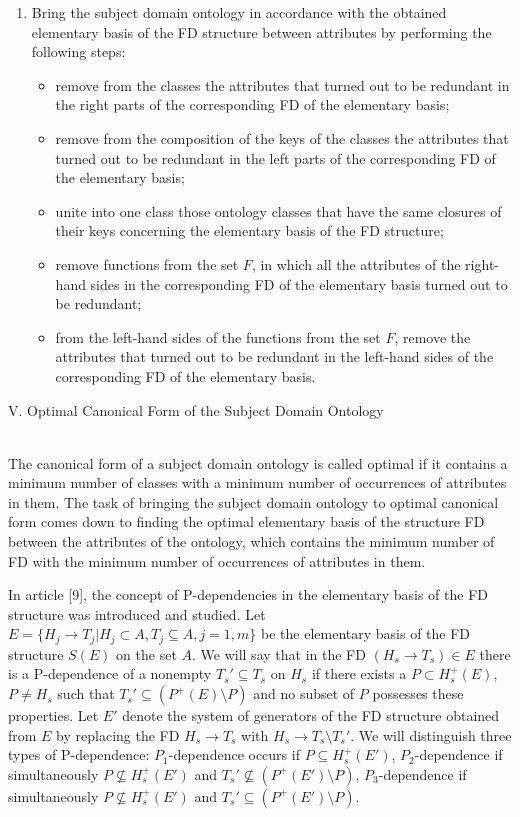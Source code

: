 \documentclass{scndocument}
\begin{document}
\begin{enumerate}[noitemsep]
    \item Bring the subject domain ontology in accordance with the obtained elementary basis of the FD structure between attributes by performing the following steps:
    \begin{itemize}[noitemsep]
        \item remove from the classes the attributes that turned out to be redundant in the right parts of the corresponding FD of the elementary basis;
        \item remove from the composition of the keys of the classes the attributes that turned out to be redundant in the left parts of the corresponding FD of the elementary basis;
        \item unite into one class those ontology classes that have the same closures of their keys concerning the elementary basis of the FD structure;
        \item remove functions from the set $F$, in which all the attributes of the right-hand sides in the corresponding FD of the elementary basis turned out to be redundant;
        \item from the left-hand sides of the functions from the set $F$, remove the attributes that turned out to be redundant in the left-hand sides of the corresponding FD of the elementary basis.
    \end{itemize}
\end{enumerate}

\begin{center}
{V. Optimal Canonical Form of the Subject Domain Ontology}
\end{center}
\\

{The canonical form of a subject domain ontology is called optimal if it contains a minimum number of classes with a minimum number of occurrences of attributes in them. The task of bringing the subject domain ontology to optimal canonical form comes down to finding the optimal elementary basis of the structure FD between the attributes of the ontology, which contains the minimum number of FD with the minimum number of occurrences of attributes in them.}

{In article [9], the concept of P-dependencies in the elementary basis of the FD structure was introduced and studied. Let $E = \{H_j \to T_j | H_j \subset A, T_j \subseteq A, j = 1, m\}$ be the elementary basis of the FD structure $S(E)$ on the set $A$. We will say that in the FD $(H_s \to T_s) \in E$ there is a P-dependence of a nonempty $T_s' \subseteq T_s$ on $H_s$ if there exists a $P \subset H_s^+(E)$, $P \neq H_s$ such that $T_s' \subseteq (P^+(E) \setminus P)$ and no subset of $P$ possesses these properties. Let $E'$ denote the system of generators of the FD structure obtained from $E$ by replacing the FD $H_s \to T_s$ with $H_s \to T_s \setminus T_s'$. We will distinguish three types of P-dependence: $P_1$-dependence occurs if $P \subseteq H_s^+(E')$, $P_2$-dependence if simultaneously $P \not\subseteq H_s^+(E')$ and $T_s' \not\subseteq (P^+(E') \setminus P)$, $P_3$-dependence if simultaneously $P \not\subseteq H_s^+(E')$ and $T_s' \subseteq (P^+(E') \setminus P)$.}
\end{document}
